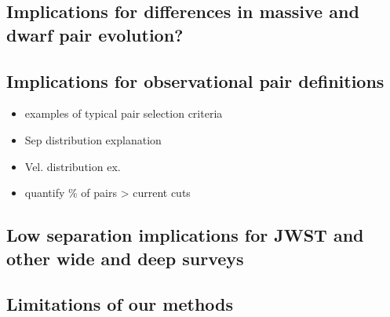 \documentclass[twocolumn]{aastex631}
\begin{document}
\subsection{Implications for differences in massive and dwarf pair evolution?}


\subsection{Implications for observational pair definitions}
    \begin{itemize}
        \item examples of typical pair selection criteria
        \item Sep distribution explanation
        \item Vel. distribution ex.
        \item quantify \% of pairs > current cuts 
        
    \end{itemize}
    
\subsection{Low separation implications for JWST and other wide and deep surveys}

\subsection{Limitations of our methods}
\pagebreak











\end{document}
